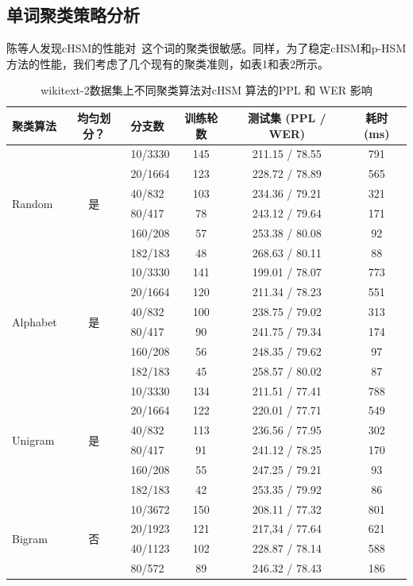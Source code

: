 \subsection{单词聚类策略分析}
陈等人发现cHSM的性能对~这个词的聚类很敏感。同样，为了稳定cHSM和p-HSM方法的性能，我们考虑了几个现有的聚类准则，如表1和表2所示。
\begin{table}[!t]
  \centering
  \caption{wikitext-2数据集上不同聚类算法对cHSM 算法的PPL 和 WER 影响\label{table:clustering}}
  \begin{tabular}{lclccc} \toprule
聚类算法 & 均匀划分？&分支数& 训练轮数& 测试集 (PPL / WER)&耗时 (ms)\\ \midrule
  \multirow{6}{*}{Random}  &\multirow{6}{*}{是}&10/3330&145&211.15 / 78.55 &791\\
    &&20/1664&123&228.72 / 78.89&565\\
    &&40/832&103&234.36 / 79.21&321\\
    &&80/417&78&243.12 / 79.64&171\\
    &&160/208 &57&253.38 / 80.08&92\\
    &&182/183&48&268.63 / 80.11&88\\
  \midrule
  \multirow{6}{*}{Alphabet}  &\multirow{6}{*}{是}&10/3330 &141&199.01 / 78.07 &773\\
    &&20/1664 &120&211.34 / 78.23&551\\
    &&40/832 &100&238.75 / 79.02&313\\
    &&80/417 &90&241.75 / 79.34&174\\
    &&160/208 &56&248.35 / 79.62&97\\
    &&182/183&45&258.57 / 80.02&87\\
  \midrule
  \multirow{6}{*}{Unigram}   &\multirow{6}{*}{是} &10/3330&134&211.51 / 77.41 &788\\
    & &20/1664&122&220.01 / 77.71&549\\
    & &40/832&113&236.56 / 77.95&302\\
    & &80/417&91& 241.12 / 78.25&170\\
    & &160/208&55&247.25 / 79.21&93\\
    & &182/183&42&253.35 / 79.92&86\\
  \midrule
  \multirow{5}{*}{Bigram}   &\multirow{5}{*}{否}&10/3672&150&208.11 / 77.32&801\\
     &&20/1923&121&217,34 / 77.64&621\\
     &&40/1123&102&228.87 / 78.14&588\\
     &&80/572&89&246.32 / 78.43&186\\

\end{tabular}
\end{table}
